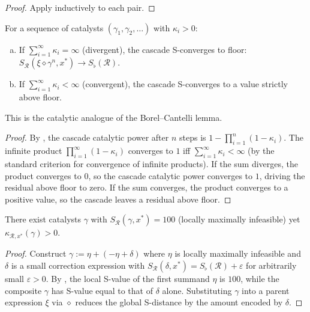 \begin{proof}
Apply  inductively to each pair.
\end{proof}

\begin{corollary}
\label{cor:asymptotic-floor}
For a sequence of catalysts $(\gamma_1, \gamma_2, \ldots)$ with $\kappa_i > 0$:
\begin{enumerate}[(a)]
  \item If $\sum_{i=1}^\infty \kappa_i = \infty$ (divergent), the cascade
    S-converges to floor: $S_{\mathcal{R}}(\xi \diamond \gamma^n, x^*)
    \to S_\flat(\mathcal{R})$.
  \item If $\sum_{i=1}^\infty \kappa_i < \infty$ (convergent), the cascade
    S-converges to a value strictly above floor.
\end{enumerate}
This is the catalytic analogue of the Borel--Cantelli lemma.
\end{corollary}

\begin{proof}
By , the cascade catalytic power after $n$ steps is
$1 - \prod_{i=1}^n(1 - \kappa_i)$.  The infinite product
$\prod_{i=1}^\infty(1 - \kappa_i)$ converges to $1$ iff
$\sum_{i=1}^\infty \kappa_i < \infty$ (by the standard criterion for
convergence of infinite products).  If the sum diverges, the product
converges to $0$, so the cascade catalytic power converges to $1$, driving
the residual above floor to zero.  If the sum converges, the product
converges to a positive value, so the cascade leaves a residual above floor.
\end{proof}

\begin{theorem}
\label{thm:loc-imp-positive}
There exist catalysts $\gamma$ with $S_{\mathcal{R}}(\gamma, x^*) = 100$
(locally maximally infeasible) yet $\kappa_{\mathcal{R}, x^*}(\gamma) > 0$.
\end{theorem}

\begin{proof}
Construct $\gamma := \eta + (-\eta + \delta)$ where $\eta$ is locally
maximally infeasible and $\delta$ is a small correction expression with
$S_{\mathcal{R}}(\delta, x^*) = S_\flat(\mathcal{R}) + \varepsilon$ for
arbitrarily small $\varepsilon > 0$.  By , the
local S-value of the first summand $\eta$ is $100$, while the composite
$\gamma$ has S-value equal to that of $\delta$ alone.  Substituting
$\gamma$ into a parent expression $\xi$ via $\diamond$ reduces the global
S-distance by the amount encoded by $\delta$.
\end{proof}

